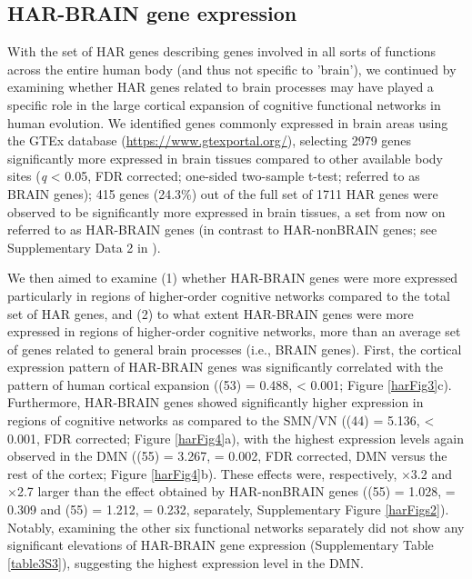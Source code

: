 \begin{refsection}
\subsection*{HAR-BRAIN gene expression}
With the set of HAR genes describing genes involved in all sorts of functions across the entire human body (and thus not specific to 'brain'), we continued by examining whether HAR genes related to brain processes may have played a specific role in the large cortical expansion of cognitive functional networks in human evolution. We identified genes commonly expressed in brain areas using the GTEx database (\url{https://www.gtexportal.org/}), selecting 2979 genes significantly more expressed in brain tissues compared to other available body sites (\textit{q} < 0.05, FDR corrected; one-sided two-sample t-test; referred to as BRAIN genes); 415 genes (24.3\%) out of the full set of 1711 HAR genes were observed to be significantly more expressed in brain tissues, a set from now on referred to as HAR-BRAIN genes (in contrast to HAR-nonBRAIN genes; see Supplementary Data 2 in \citep{Wei2019GeneticMA}).

We then aimed to examine (1) whether HAR-BRAIN genes were more expressed particularly in regions of higher-order cognitive networks compared to the total set of HAR genes, and (2) to what extent HAR-BRAIN genes were more expressed in regions of higher-order cognitive networks, more than an average set of genes related to general brain processes (i.e., BRAIN genes). First, the cortical expression pattern of HAR-BRAIN genes was significantly correlated with the pattern of human cortical expansion (\rvaldf(53) = 0.488, \pval < 0.001; Figure \ref{harFig3}c). Furthermore, HAR-BRAIN genes showed significantly higher expression in regions of cognitive networks as compared to the SMN/VN (\tvaldf(44) = 5.136, \pval < 0.001, FDR corrected; Figure \ref{harFig4}a), with the highest expression levels again observed in the DMN (\tvaldf(55) = 3.267, \pval = 0.002, FDR corrected, DMN versus the rest of the cortex; Figure \ref{harFig4}b). These effects were, respectively, $\times$3.2 and $\times$2.7 larger than the effect obtained by HAR-nonBRAIN genes (\tval(55) = 1.028, \pval = 0.309 and \tvaldf(55) = 1.212, \pval = 0.232, separately, Supplementary Figure \ref{harFigs2}). Notably, examining the other six functional networks separately did not show any significant elevations of HAR-BRAIN gene expression (Supplementary Table \ref{table3S3}), suggesting the highest expression level in the DMN.


\end{refsection}
